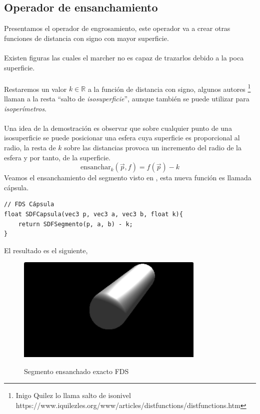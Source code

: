 \subsection{Operador de ensanchamiento}
Presentamos el operador de engrosamiento, este operador va a crear otras funciones de distancia con signo con mayor superficie.\\\\
Existen figuras las cuales el marcher no es capaz de trazarlos debido a la poca superficie.\\\\  Restaremos un valor \(k\in\mathbb{R}\) a la función de distancia con signo, algunos autores \footnote{Inigo Quilez lo llama salto de isonivel https://www.iquilezles.org/www/articles/distfunctions/distfunctions.htm} llaman a la resta \enquote{salto de \textit{isosuperficie}}, aunque también se puede utilizar para \textit{isoperímetros}.\\\\ Una idea de la demostración es observar que sobre cualquier punto de una isosuperficie se puede posicionar una esfera cuya superficie es proporcional al radio, la resta de \(k\) sobre las distancias provoca un incremento del radio de la esfera y por tanto, de la superficie.  
\[\text{ensanchar}_k(\Vec{p}, f)=f(\Vec{p})-k\]
Veamos el ensanchamiento del segmento visto en , esta nueva función es llamada cápsula.
\begin{lstlisting}
// FDS Cápsula
float SDFCapsula(vec3 p, vec3 a, vec3 b, float k){
	return SDFSegmento(p, a, b) - k;
}
\end{lstlisting}
El resultado es el siguiente,
\begin{figure}[H]
  \centering
  \captionsetup{justification=centering}%
  \includegraphics[width=0.8\textwidth]{secciones/imagenes/sdf_capsula.jpeg}\label{fig:capsula}
  \caption{Segmento ensanchado exacto FDS}
\end{figure}

